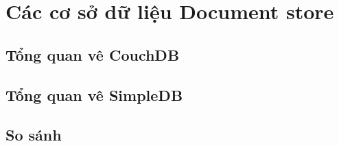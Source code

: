 \chapter{Các cơ sở dữ liệu Document store}

\section{Tổng quan vê CouchDB}

\section{Tổng quan vê SimpleDB}

\section{So sánh}